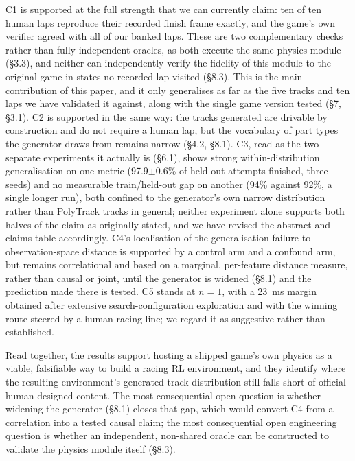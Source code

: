 \documentclass[11pt]{article}
\begin{document}
C1 is supported at the full strength that we can currently claim: ten of ten human laps reproduce their recorded finish frame exactly, and the game's own verifier agreed with all of our banked laps. These are two complementary checks rather than fully independent oracles, as both execute the same physics module (\S3.3), and neither can independently verify the fidelity of this module to the original game in states no recorded lap visited (\S8.3). This is the main contribution of this paper, and it only generalises as far as the five tracks and ten laps we have validated it against, along with the single game version tested (\S7, \S3.1). C2 is supported in the same way: the tracks generated are drivable by construction and do not require a human lap, but the vocabulary of part types the generator draws from remains narrow (\S4.2, \S8.1). C3, read as the two separate experiments it actually is (\S6.1), shows strong within-distribution generalisation on one metric (97.9$\pm$0.6\% of held-out attempts finished, three seeds) and no measurable train/held-out gap on another (94\% against 92\%, a single longer run), both confined to the generator's own narrow distribution rather than PolyTrack tracks in general; neither experiment alone supports both halves of the claim as originally stated, and we have revised the abstract and claims table accordingly. C4's localisation of the generalisation failure to observation-space distance is supported by a control arm and a confound arm, but remains correlational and based on a marginal, per-feature distance measure, rather than causal or joint, until the generator is widened (\S8.1) and the prediction made there is tested. C5 stands at $n=1$, with a 23~ms margin obtained after extensive search-configuration exploration and with the winning route steered by a human racing line; we regard it as suggestive rather than established.

Read together, the results support hosting a shipped game's own physics as a viable, falsifiable way to build a racing RL environment, and they identify where the resulting environment's generated-track distribution still falls short of official human-designed content. The most consequential open question is whether widening the generator (\S8.1) closes that gap, which would convert C4 from a correlation into a tested causal claim; the most consequential open engineering question is whether an independent, non-shared oracle can be constructed to validate the physics module itself (\S8.3).
\end{document}

